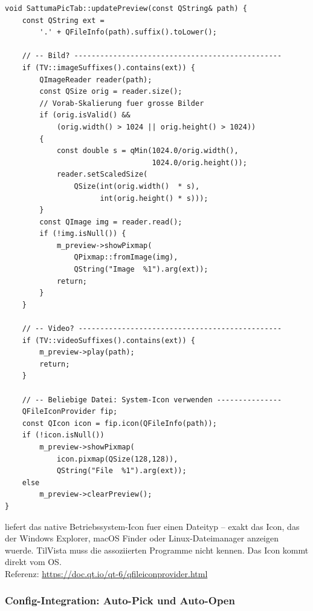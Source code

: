 \begin{lstlisting}[caption={updatePreview: drei Zweige fuer Bild/Video/sonstige}]
void SattumaPicTab::updatePreview(const QString& path) {
    const QString ext =
        '.' + QFileInfo(path).suffix().toLower();

    // -- Bild? ------------------------------------------------
    if (TV::imageSuffixes().contains(ext)) {
        QImageReader reader(path);
        const QSize orig = reader.size();
        // Vorab-Skalierung fuer grosse Bilder
        if (orig.isValid() &&
            (orig.width() > 1024 || orig.height() > 1024))
        {
            const double s = qMin(1024.0/orig.width(),
                                  1024.0/orig.height());
            reader.setScaledSize(
                QSize(int(orig.width()  * s),
                      int(orig.height() * s)));
        }
        const QImage img = reader.read();
        if (!img.isNull()) {
            m_preview->showPixmap(
                QPixmap::fromImage(img),
                QString("Image  %1").arg(ext));
            return;
        }
    }

    // -- Video? -----------------------------------------------
    if (TV::videoSuffixes().contains(ext)) {
        m_preview->play(path);
        return;
    }

    // -- Beliebige Datei: System-Icon verwenden ---------------
    QFileIconProvider fip;
    const QIcon icon = fip.icon(QFileInfo(path));
    if (!icon.isNull())
        m_preview->showPixmap(
            icon.pixmap(QSize(128,128)),
            QString("File  %1").arg(ext));
    else
        m_preview->clearPreview();
}
\end{lstlisting}

\begin{qtinfo}[title={Qt-Hintergrund: QFileIconProvider}]
 liefert das native
Betriebssystem-Icon fuer einen Dateityp -- exakt das Icon,
das der Windows Explorer, macOS Finder oder Linux-Dateimanager
anzeigen wuerde. TilVista muss die assoziierten Programme
nicht kennen. Das Icon kommt direkt vom OS.\\
Referenz: \url{https://doc.qt.io/qt-6/qfileiconprovider.html}
\end{qtinfo}

\subsubsection{Config-Integration: Auto-Pick und Auto-Open}

